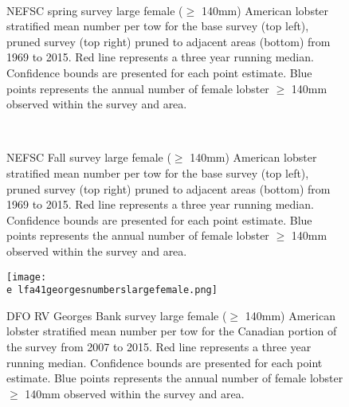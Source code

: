 \documentclass[11pt]{article}
\newcommand{\e}{/backup/bio_data/bio.lobster/figures/} %
\begin{document}
\begin{figure}
\centering
{}
\\
\caption{NEFSC spring survey large female ($\geq$ 140mm) American lobster stratified mean number per tow for the base survey (top left), pruned survey (top right) pruned to adjacent areas (bottom) from 1969 to 2015. Red line represents a three year running median. Confidence bounds are presented for each point estimate. Blue points represents the annual number of female lobster $\geq$ 140mm observed within the survey and area.}
\end{figure}
\clearpage


\begin{figure}
\centering
{}
\\
\caption{NEFSC Fall survey large female ($\geq$ 140mm) American lobster stratified mean number per tow for the base survey (top left), pruned survey (top right) pruned to adjacent areas (bottom) from 1969 to 2015. Red line represents a three year running median. Confidence bounds are presented for each point estimate. Blue points represents the annual number of female lobster $\geq$ 140mm observed within the survey and area.}
\end{figure}
\clearpage

\begin{figure}

    \texttt{[image: \\e lfa41georgesnumberslargefemale.png]}
    \caption{DFO RV Georges Bank survey large female ($\geq$ 140mm) American lobster stratified mean number per tow for the Canadian portion of the survey from 2007 to 2015. Red line represents a three year running median. Confidence bounds are presented for each point estimate. Blue points represents the annual number of female lobster $\geq$ 140mm observed within the survey and area.}

\end{figure}
\end{document}
